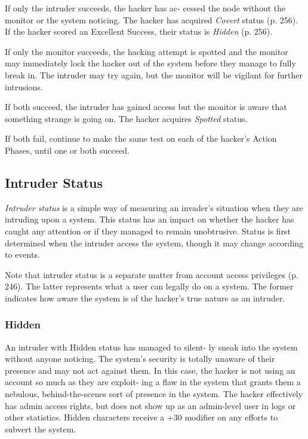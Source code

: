 If only the intruder succeeds, the hacker has ac-
cessed the node without the monitor or the system 
noticing. The hacker has acquired \textit{Covert} status (p. 
256). If the hacker scored an Excellent Success, their 
status is \textit{Hidden }(p. 256).

If only the monitor succeeds, the hacking attempt 
is spotted and the monitor may immediately lock the 
hacker out of the system before they manage to fully 
break in. The intruder may try again, but the monitor 
will be vigilant for further intrusions.

If both succeed, the intruder has gained access but 
the monitor is aware that something strange is going 
on. The hacker acquires \textit{Spotted} status.

If both fail, continue to make the same test on each 
of the hacker's Action Phases, until one or both succeed.

\subsection{Intruder Status}

\textit{Intruder status} is a simple way of measuring an 
invader's situation when they are intruding upon 
a system. This status has an impact on whether the 
hacker has caught any attention or if they managed 
to remain unobtrusive. Status is first determined when 
the intruder access the system, though it may change 
according to events.

Note that intruder status is a separate matter from 
account access privileges (p. 246). The latter represents 
what a user can legally do on a system. The former 
indicates how aware the system is of the hacker's true 
nature as an intruder.

\subsubsection{Hidden}

An intruder with Hidden status has managed to silent-
ly sneak into the system without anyone noticing. The 
system's security is totally unaware of their presence 
and may not act against them. In this case, the hacker 
is not using an account so much as they are exploit-
ing a flaw in the system that grants them a nebulous, 
behind-the-scenes sort of presence in the system. The 
hacker effectively has admin access rights, but does 
not show up as an admin-level user in logs or other 
statistics. Hidden characters receive a +30 modifier on 
any efforts to subvert the system.

